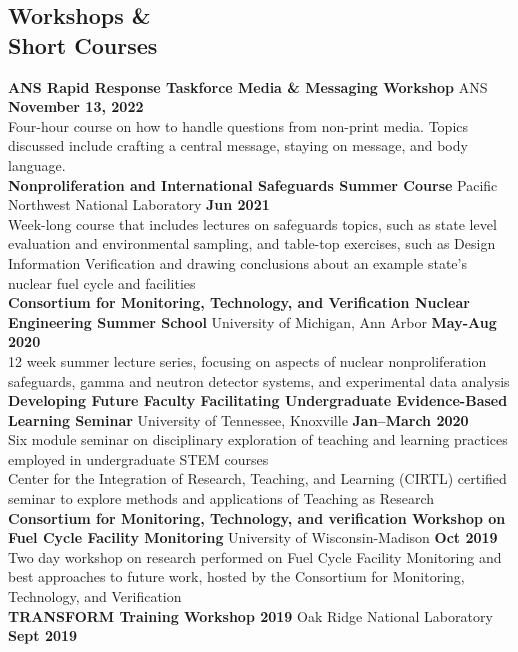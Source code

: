 \documentclass[margin,line]{resume}
\begin{document}
\begin{resume}
    \section{\mysidestyle Workshops \&\\Short Courses}
    \textbf{ANS Rapid Response Taskforce Media \& Messaging Workshop} ANS \hfill \textbf{November 13, 2022}\\
    Four-hour course on how to handle questions from non-print media. Topics discussed 
    include crafting a central message, staying on message, and body language. \\
    \textbf{Nonproliferation and International Safeguards Summer Course} Pacific Northwest National Laboratory \hfill \textbf{Jun 2021} \\
    Week-long course that includes lectures on safeguards topics, such as state level evaluation and environmental sampling, and 
    table-top exercises, such as Design Information Verification and drawing conclusions about an example state's nuclear 
    fuel cycle and facilities \\
    \textbf{Consortium for Monitoring, Technology, and Verification Nuclear Engineering Summer School} University of Michigan, Ann Arbor \hfill \textbf{May-Aug 2020} \\
    12 week summer lecture series, focusing on aspects of nuclear nonproliferation safeguards, gamma and neutron detector systems, and experimental data analysis \\
    \textbf{Developing Future Faculty Facilitating Undergraduate Evidence-Based Learning Seminar} University of Tennessee, Knoxville \hfill \textbf{Jan--March 2020} \\
    Six module seminar on disciplinary exploration of teaching and learning practices employed in undergraduate STEM courses \\
    Center for the Integration of Research, Teaching, and Learning (CIRTL) certified seminar to explore methods and applications of Teaching as Research\\
    \textbf{Consortium for Monitoring, Technology, and verification Workshop on Fuel Cycle Facility Monitoring} University of Wisconsin-Madison \hfill \textbf{Oct 2019} \\
    Two day workshop on research performed on Fuel Cycle Facility Monitoring and best approaches to future work, hosted by the Consortium for Monitoring, Technology, and Verification \\
    \textbf{TRANSFORM Training Workshop 2019} Oak Ridge National Laboratory \hfill \textbf{Sept 2019} \\

\end{resume}
\end{document}
